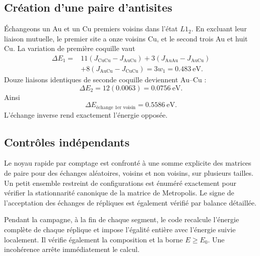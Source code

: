 \documentclass[10pt,a4paper]{article}
\newcommand{\Au}{\mathrm{Au}}
\newcommand{\Cu}{\mathrm{Cu}}
\begin{document}
\subsection{Création d'une paire d'antisites}
Échangeons un Au et un Cu premiers voisins dans l'état $L1_2$. En excluant
leur liaison mutuelle, le premier site a onze voisins Cu, et le second trois
Au et huit Cu. La variation de première coquille vaut
\begin{align*}
\Delta E_1={}&11(J_{\Cu\Cu}-J_{\Au\Cu})
+3(J_{\Au\Au}-J_{\Au\Cu})\\
&+8(J_{\Au\Cu}-J_{\Cu\Cu})=3w_1=0.483\ \mathrm{eV}.
\end{align*}
Douze liaisons identiques de seconde coquille deviennent Au--Cu :
\[
\Delta E_2=12(0.0063)=0.0756\ \mathrm{eV}.
\]
Ainsi
\[
\boxed{\Delta E_{\text{échange 1er voisin}}=0.5586\ \mathrm{eV}.}
\]
L'échange inverse rend exactement l'énergie opposée.

\subsection{Contrôles indépendants}
Le noyau rapide par comptage est confronté à une somme explicite des
matrices de paire pour des échanges aléatoires, voisins et non voisins, sur
plusieurs tailles. Un petit ensemble restreint de configurations est énuméré
exactement pour vérifier la stationnarité canonique de la matrice de
Metropolis. Le signe de l'acceptation des échanges de répliques est également
vérifié par balance détaillée.

Pendant la campagne, à la fin de chaque segment, le code recalcule l'énergie
complète de chaque réplique et impose l'égalité entière avec l'énergie suivie
localement. Il vérifie également la composition et la borne $E\ge E_0$.
Une incohérence arrête immédiatement le calcul.
\end{document}
